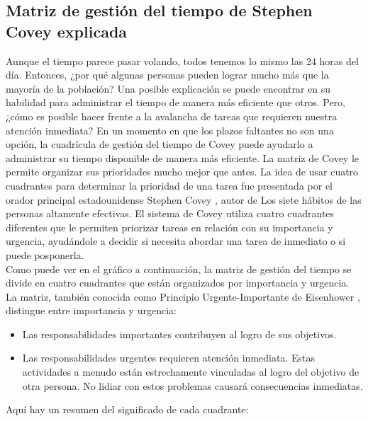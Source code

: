 \documentclass[10pt]{book}
\begin{document}
\subsection{Matriz de gestión del tiempo de Stephen Covey explicada}
Aunque el tiempo parece pasar volando, todos tenemos lo mismo las 24 horas del día. Entonces, ¿por qué algunas personas pueden lograr mucho más que la mayoría de la población? Una posible explicación se puede encontrar en su habilidad para administrar el tiempo de manera más eficiente que otros. Pero, ¿cómo es posible hacer frente a la avalancha de tareas que requieren nuestra atención inmediata? En un momento en que los plazos faltantes no son una opción, la cuadrícula de gestión del tiempo de Covey puede ayudarlo a administrar su tiempo disponible de manera más eficiente. La matriz de Covey le permite organizar sus prioridades mucho mejor que antes. La idea de usar cuatro cuadrantes para determinar la prioridad de una tarea fue presentada por el orador principal estadounidense Stephen Covey , autor de Los siete hábitos de las personas altamente efectivas. El sistema de Covey utiliza cuatro cuadrantes diferentes que le permiten priorizar tareas en relación con su importancia y urgencia, ayudándole a decidir si necesita abordar una tarea de inmediato o si puede posponerla.\\
Como puede ver en el gráfico a continuación, la matriz de gestión del tiempo se divide en cuatro cuadrantes que están organizados por importancia y urgencia.\\
La matriz, también conocida como Principio Urgente-Importante de Eisenhower , distingue entre importancia y urgencia:
\begin{itemize}
\item Las responsabilidades importantes contribuyen al logro de sus objetivos.
\item Las responsabilidades urgentes requieren atención inmediata. Estas actividades a menudo están estrechamente vinculadas al logro del objetivo de otra persona. No lidiar con estos problemas causará consecuencias inmediatas.
\end{itemize}
Aquí hay un resumen del significado de cada cuadrante:
\end{document}
